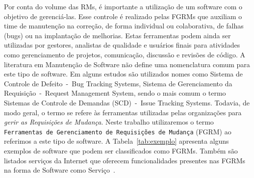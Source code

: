 Por conta do volume das RMs, é importante a utilização de um software com o
objetivo de gerenciá-las. Esse controle é realizado pelas FGRMs que auxiliam o
time de manutenção na correção, de forma individual ou colaborativa, de falhas
(bugs) ou na implantação de melhorias. Estas ferramentas podem ainda ser
utilizadas por gestores, analistas de qualidade e usuários finais para
atividades como gerenciamento de projetos, comunicação, discussão e revisões de
código. A literatura em Manutenção de Software não define uma nomenclatura comum
para este tipo de software. Em alguns estudos são utilizados nomes como Sistema
de Controle de Defeito~-~Bug Tracking Systems, Sistema de Gerenciamento da
Requisição~-~Request Management System, sendo o mais comum o termo Sistemas de
Controle de Demandas (SCD)~-~Issue Tracking Systems. Todavia, de modo geral, o
termo se refere às ferramentas utilizadas pelas organizações para \textit{gerir
    as Requisições de Mudança}. Neste trabalho utilizaremos o termo
\texttt{Ferramentas de Gerenciamento de Requisições de Mudança} (FGRM) ao
referimos a este tipo de software. A Tabela~\ref{tab:exemplo} apresenta alguns
exemplos de software que podem ser classificados como FGRMs. Também são listados
serviços da Internet que oferecem funcionalidades presentes nas FGRMs na forma
de Software como Serviço~\cite{fox2013engineering}.

\begin{table}[htpb]
\centering
{}
\caption{Exemplos de ferramentas e serviços da Internet que podem ser
    classificados como FGRMs. Extraído de~\cite{cavalcanti2014challenges}}
\label{tab:exemplo}
\end{table}

